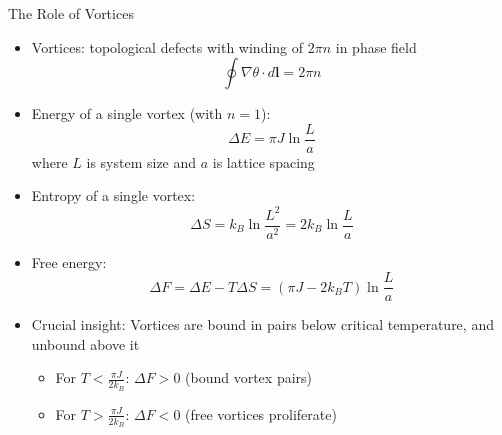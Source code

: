 \documentclass[11pt,aspectratio=169]{beamer}
\newcommand\mathalert[1]{{\color{accentcolor}#1}}
\begin{document}
\begin{frame}{The Role of Vortices}
    \begin{itemize}
        \item Vortices: topological defects with winding of $2\pi n$ in phase field
        \begin{equation}
            \oint \nabla \theta \cdot d\mathbf{l} = 2\pi n
        \end{equation}
        \item Energy of a single vortex (with $n=1$):
        \begin{equation}
            \Delta E = \pi J \ln \frac{L}{a}
        \end{equation}
        where $L$ is system size and $a$ is lattice spacing
        \pause
        \item Entropy of a single vortex:
        \begin{equation}
            \Delta S = k_B \ln \frac{L^2}{a^2} = 2k_B \ln \frac{L}{a}
        \end{equation}
        \pause
        \item Free energy:
        \begin{equation}
            \Delta F = \Delta E - T\Delta S = (\pi J - 2k_B T)\ln \frac{L}{a}
        \end{equation}
        \pause
        \item \mathalert{Crucial insight}: Vortices are bound in pairs below critical temperature, and unbound above it
        \begin{itemize}
            \item For $T < \frac{\pi J}{2k_B}$: $\Delta F > 0$ (bound vortex pairs)
            \item For $T > \frac{\pi J}{2k_B}$: $\Delta F < 0$ (free vortices proliferate)
        \end{itemize}
    \end{itemize}
\end{frame}
\end{document}
